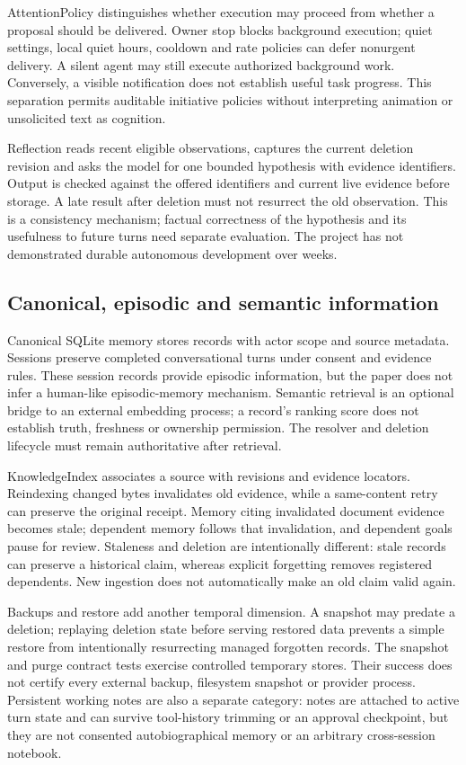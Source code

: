 \documentclass[11pt]{article}
\begin{document}
AttentionPolicy distinguishes whether execution may proceed from whether a proposal should be delivered. Owner stop blocks background execution; quiet settings, local quiet hours, cooldown and rate policies can defer nonurgent delivery. A silent agent may still execute authorized background work. Conversely, a visible notification does not establish useful task progress. This separation permits auditable initiative policies without interpreting animation or unsolicited text as cognition.

Reflection reads recent eligible observations, captures the current deletion revision and asks the model for one bounded hypothesis with evidence identifiers. Output is checked against the offered identifiers and current live evidence before storage. A late result after deletion must not resurrect the old observation. This is a consistency mechanism; factual correctness of the hypothesis and its usefulness to future turns need separate evaluation. The project has not demonstrated durable autonomous development over weeks.

\subsection{Canonical, episodic and semantic information}
Canonical SQLite memory stores records with actor scope and source metadata. Sessions preserve completed conversational turns under consent and evidence rules. These session records provide episodic information, but the paper does not infer a human-like episodic-memory mechanism. Semantic retrieval is an optional bridge to an external embedding process; a record's ranking score does not establish truth, freshness or ownership permission. The resolver and deletion lifecycle must remain authoritative after retrieval.

KnowledgeIndex associates a source with revisions and evidence locators. Reindexing changed bytes invalidates old evidence, while a same-content retry can preserve the original receipt. Memory citing invalidated document evidence becomes stale; dependent memory follows that invalidation, and dependent goals pause for review. Staleness and deletion are intentionally different: stale records can preserve a historical claim, whereas explicit forgetting removes registered dependents. New ingestion does not automatically make an old claim valid again.

Backups and restore add another temporal dimension. A snapshot may predate a deletion; replaying deletion state before serving restored data prevents a simple restore from intentionally resurrecting managed forgotten records. The snapshot and purge contract tests exercise controlled temporary stores. Their success does not certify every external backup, filesystem snapshot or provider process. Persistent working notes are also a separate category: notes are attached to active turn state and can survive tool-history trimming or an approval checkpoint, but they are not consented autobiographical memory or an arbitrary cross-session notebook.
\end{document}
